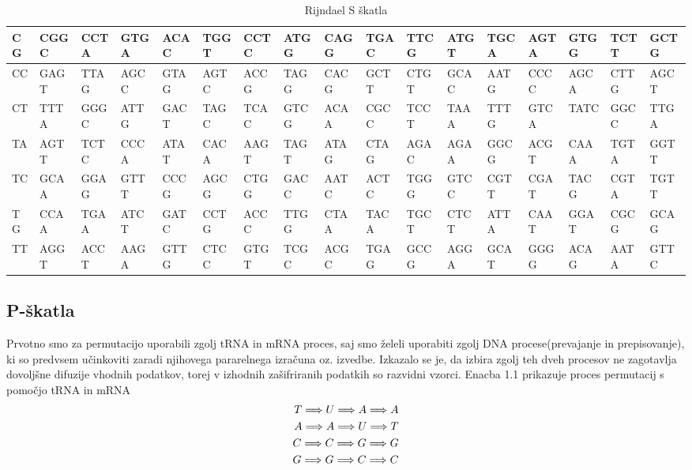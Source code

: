 \documentclass[graybox, envcountchap]{svmult}
\begin{document}
\begin{table}[!ht]
\begin{center}
{\begin{tabular}{|l|l|l|l|l|l|l|l|l|l|l|l|l|l|l|l|l|}
        CG & CGGC & CCTA & GTGA & ACAC & TGGT & CCTC & ATGG & CAGG & TGAC & TTCG & ATGT & TGCA & AGTA & GTGG & TCTT & GCTG \\ \hline
        CC & GAGT & TTAG & AGCC & GTAG & AGTC & ACCG & TAGG & CACG & GCTT & CTGT & GCAC & AATG & CCCC & AGCA & CTTG & AGCT \\ \hline
        CT & TTTA & GGGC & ATTG & GACT & TAGC & TCAC & GTCG & ACAA & CGCC & TCCT & TAAA & TTTG & GTCA & TATC & GGCC & TTGA \\ \hline
        TA & AGTT & TCTC & CCCA & ATAT & CACA & AAGT & TAGT & ATAG & CTAG & AGAC & AGAA & GGCG & ACGT & CAAA & TGTA & GGTT \\ \hline
        TC & GCAA & GGAG & GTTT & CCCG & AGCG & CTGG & GACC & AATC & ACTC & TGGG & GTCC & CGTT & CGAT & TACG & CGTA & TGTT \\ \hline
        TG & CCAA & TGAA & ATCT & GATC & CCTG & ACCC & TTGG & CTAA & TACA & TGCT & CTCT & ATTA & CAAT & GGAT & CGCG & GCAG \\ \hline
        TT & AGGT & ACCT & AAGA & GTTG & CTCC & GTGT & TCGC & ACGC & TGAG & GCCG & AGGA & GCAT & GGGG & ACAG & AATA & GTTC \\ \hline
    \end{tabular}
    }
    \caption{Rijndael S škatla}
    \label{table 1}
    \end{center}
    \raggedleft
\end{table}


\subsection{P-škatla}
\label{g01:subsec:2}

Prvotno smo za permutacijo uporabili zgolj tRNA in mRNA proces, saj smo želeli uporabiti zgolj DNA procese(prevajanje in prepisovanje), ki so predvsem učinkoviti zaradi njihovega pararelnega izračuna oz. izvedbe. Izkazalo se je, da izbira zgolj teh dveh procesov ne zagotavlja dovoljšne difuzije vhodnih podatkov, torej v izhodnih zašifriranih podatkih so razvidni vzorci. Enacba 1.1 prikazuje proces permutacij s pomočjo tRNA in mRNA
\begin{equation}
\begin{split}
\small 
T \Longrightarrow U  \Longrightarrow A \Longrightarrow A \\
A \Longrightarrow A  \Longrightarrow U \Longrightarrow T \\
C \Longrightarrow C  \Longrightarrow G \Longrightarrow G \\
G \Longrightarrow G  \Longrightarrow C \Longrightarrow C \\
\end{split}
\end{equation}
\end{document}

